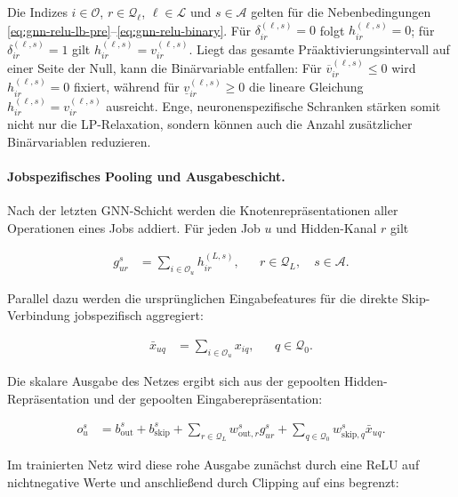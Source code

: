 Die Indizes $i\in\mathcal{O}$, $r\in\mathcal{Q}_{\ell}$,
$\ell\in\mathcal{L}$ und $s\in\mathcal{A}$ gelten für die
Nebenbedingungen \eqref{eq:gnn-relu-lb-pre}--\eqref{eq:gnn-relu-binary}.
Für $\delta_{ir}^{(\ell,s)}=0$ folgt $h_{ir}^{(\ell,s)}=0$; für
$\delta_{ir}^{(\ell,s)}=1$ gilt
$h_{ir}^{(\ell,s)}=v_{ir}^{(\ell,s)}$. Liegt das gesamte
Präaktivierungsintervall auf einer Seite der Null, kann die Binärvariable
entfallen: Für $\overline{v}_{ir}^{(\ell,s)}\le 0$ wird
$h_{ir}^{(\ell,s)}=0$ fixiert, während für
$\underline{v}_{ir}^{(\ell,s)}\ge 0$ die lineare Gleichung
$h_{ir}^{(\ell,s)}=v_{ir}^{(\ell,s)}$ ausreicht. Enge, neuronenspezifische
Schranken stärken somit nicht nur die LP-Relaxation, sondern können auch die
Anzahl zusätzlicher Binärvariablen reduzieren.

\paragraph{Jobspezifisches Pooling und Ausgabeschicht.}

Nach der letzten GNN-Schicht werden die Knotenrepräsentationen aller
Operationen eines Jobs addiert. Für jeden Job $u$ und Hidden-Kanal $r$ gilt

\begin{align}
g_{ur}^{s}
&=
\sum_{i\in\mathcal{O}_u}h_{ir}^{(L,s)},
&&
r\in\mathcal{Q}_{L},\quad s\in\mathcal{A}.
\label{eq:gnn-job-pooling}
\end{align}

Parallel dazu werden die ursprünglichen Eingabefeatures für die direkte
Skip-Verbindung jobspezifisch aggregiert:

\begin{align}
\bar{x}_{uq}
&=
\sum_{i\in\mathcal{O}_u}x_{iq},
&&
q\in\mathcal{Q}_{0}.
\label{eq:gnn-input-pooling}
\end{align}

Die skalare Ausgabe des Netzes ergibt sich aus der gepoolten
Hidden-Repräsentation und der gepoolten Eingaberepräsentation:

\begin{align}
o_u^s
&=
b_{\mathrm{out}}^s+b_{\mathrm{skip}}^s
+\sum_{r\in\mathcal{Q}_{L}}w_{\mathrm{out},r}^s g_{ur}^{s}
+\sum_{q\in\mathcal{Q}_{0}}w_{\mathrm{skip},q}^s\bar{x}_{uq}.
\label{eq:gnn-output}
\end{align}

Im trainierten Netz wird diese rohe Ausgabe zunächst durch eine ReLU auf
nichtnegative Werte und anschließend durch Clipping auf eins begrenzt:

